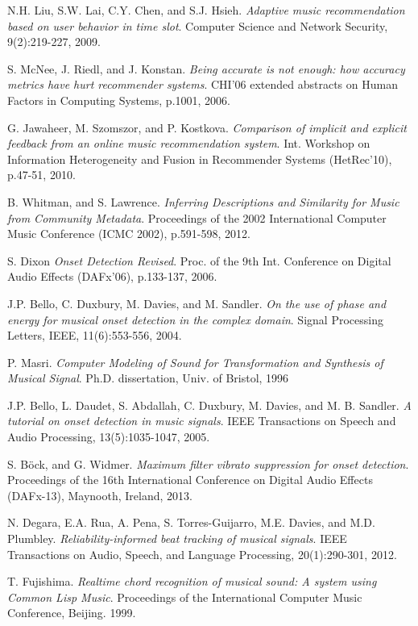 \documentclass[11pt, oneside, openright]{Thesis} %
\begin{document}
\begin{thebibliography}{99}
N.H. Liu, S.W. Lai, C.Y. Chen, and S.J. Hsieh.
\textit{Adaptive music recommendation based on user behavior in time slot}.
Computer Science and Network Security, 9(2):219-227, 2009.

S. McNee, J. Riedl, and J. Konstan.
\textit{Being accurate is not enough: how accuracy metrics have hurt recommender systems}.
CHI'06 extended abstracts on Human Factors in Computing Systems, p.1001, 2006.

G. Jawaheer, M. Szomszor, and P. Kostkova.
\textit{Comparison of implicit and explicit feedback from an online music recommendation system}.
Int. Workshop on Information Heterogeneity and Fusion in Recommender Systems (HetRec'10), p.47-51, 2010.

B. Whitman, and S. Lawrence.
\textit{Inferring Descriptions and Similarity for Music from Community Metadata}.
Proceedings of the 2002 International Computer Music Conference (ICMC 2002), p.591-598, 2012.

S. Dixon
\textit{Onset Detection Revised}.
Proc. of the 9th Int. Conference on Digital Audio Effects (DAFx’06), p.133-137, 2006.

J.P. Bello, C. Duxbury, M. Davies, and M. Sandler.
\textit{On the use of phase and energy for musical onset detection in the complex domain}.
Signal Processing Letters, IEEE, 11(6):553-556, 2004.

P. Masri.
\textit{Computer Modeling of Sound for Transformation and Synthesis of Musical Signal}.
Ph.D. dissertation, Univ. of Bristol, 1996

J.P. Bello, L. Daudet, S. Abdallah, C. Duxbury, M. Davies, and M. B. Sandler.
\textit{A tutorial on onset detection in music signals}.
IEEE Transactions on Speech and Audio Processing, 13(5):1035-1047, 2005.

S. Böck, and G. Widmer.
\textit{Maximum filter vibrato suppression for onset detection}.
Proceedings of the 16th International Conference on Digital Audio Effects (DAFx-13), Maynooth, Ireland, 2013.

N. Degara, E.A. Rua, A. Pena, S. Torres-Guijarro, M.E. Davies, and M.D. Plumbley.
\textit{Reliability-informed beat tracking of musical signals}.
IEEE Transactions on Audio, Speech, and Language Processing, 20(1):290-301, 2012.

T. Fujishima.
\textit{Realtime chord recognition of musical sound: A system using Common Lisp Music}.
Proceedings of the International Computer Music Conference, Beijing. 1999.


\end{thebibliography}
\end{document}
